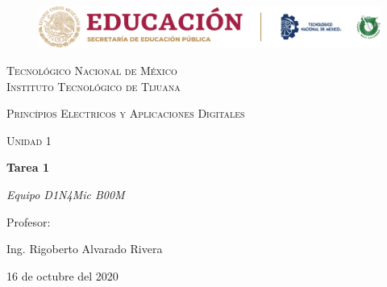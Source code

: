 \documentclass[letterpaper, 12pt]{article}
\begin{document}
    
    \begin{titlepage}
        \begin{figure}[ht]
            \centering
            \includegraphics[width=15cm]{logosITT.png}
        \end{figure}
        \centering
        {\scshape\LARGE Tecnológico Nacional de México\\Instituto Tecnológico de Tijuana\par}
        \vspace{1cm}
        {\scshape\Large Princípios Electricos y Aplicaciones Digitales\par}
        \vspace{1cm}
        {\scshape\Large Unidad 1\par}
        \vspace{1.5cm}
        {\huge\bfseries Tarea 1\par}
        \vspace{2cm}
        {\Large\itshape Equipo D1N4Mic B00M\par}
        \vfill
        Profesor: \par
        Ing. Rigoberto Alvarado Rivera
        
        \vfill

        {\large 16 de octubre del 2020}
    \end{titlepage}

    \newpage
    \thispagestyle{empty}
    \tableofcontents
    \listoffigures
\end{document}
